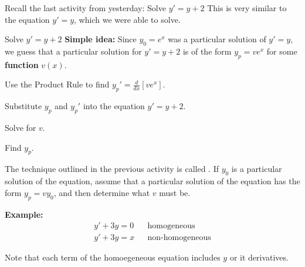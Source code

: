 
\begin{applicationActivities}

\begin{observation}
Recall the last activity from yesterday:
\vfill
Solve \(y'=y+2\)
\vfill
This is very similar to the equation \(y'=y\), which we were able to solve.
\end{observation}

\begin{activity}{15}
Solve \(y'=y+2\)
\vfill
\textbf{Simple idea:} Since \(y_0=e^x\) was a particular solution of \(y'=y\), 
we guess that a particular solution for \(y'=y+2\) is of the form \(y_p =  v e^x\) 
for some \textbf{function} \(v(x)\). 
\begin{subactivity}
Use the Product Rule to find \(y_p'=\frac{d}{dx}[ve^x]\).
\end{subactivity}
\begin{subactivity}
Substitute \(y_p\) and \(y_p'\) into the equation \(y'=y+2\).
\end{subactivity}
\begin{subactivity}
Solve for \(v\).
\end{subactivity}
\begin{subactivity}
Find \(y_p\).
\end{subactivity}
\end{activity}

\begin{observation}
The technique outlined in the previous activity is called .  
If \(y_0\) is a particular solution of the  equation, 
assume that a particular solution of the 
 equation has the form \(y_p = v y_0\), and then determine what \(v\) must be. 

\vfill

\textbf{Example: }
\begin{align*}
y'+3y = 0 & & \text{homogeneous} \\
y'+3y = x & & \text{non-homogeneous}
\end{align*}

Note that each term of the homoegeneous equation includes \(y\) or it derivatives.
\end{observation}


\end{applicationActivities}
